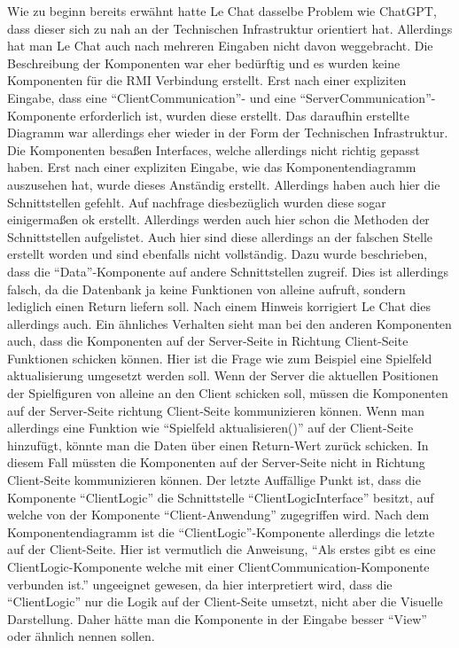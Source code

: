 Wie zu beginn bereits erwähnt hatte Le Chat dasselbe Problem wie ChatGPT, dass dieser sich zu nah an der Technischen Infrastruktur orientiert hat.
Allerdings hat man Le Chat auch nach mehreren Eingaben nicht davon weggebracht. Die Beschreibung der Komponenten war eher bedürftig und es wurden 
keine Komponenten für die RMI Verbindung erstellt. Erst nach einer expliziten Eingabe, dass eine ``ClientCommunication''- und eine 
``ServerCommunication''-Komponente erforderlich ist, wurden diese erstellt. Das daraufhin erstellte Diagramm war allerdings eher wieder in der Form 
der Technischen Infrastruktur. Die Komponenten besaßen Interfaces, welche allerdings nicht richtig gepasst haben. Erst nach einer expliziten Eingabe, wie
das Komponentendiagramm auszusehen hat, wurde dieses Anständig erstellt. Allerdings haben auch hier die Schnittstellen gefehlt. Auf nachfrage diesbezüglich
wurden diese sogar einigermaßen ok erstellt. Allerdings werden auch hier schon die Methoden der Schnittstellen aufgelistet. Auch hier sind diese allerdings 
an der falschen Stelle erstellt worden und sind ebenfalls nicht vollständig. Dazu wurde beschrieben, dass die ``Data''-Komponente auf andere Schnittstellen
zugreif. Dies ist allerdings falsch, da die Datenbank ja keine Funktionen von alleine aufruft, sondern lediglich einen Return liefern soll. Nach einem Hinweis 
korrigiert Le Chat dies allerdings auch. Ein ähnliches Verhalten sieht man bei den anderen Komponenten auch, dass die Komponenten auf der Server-Seite in Richtung
Client-Seite Funktionen schicken können. Hier ist die Frage wie zum Beispiel eine Spielfeld aktualisierung umgesetzt werden soll. Wenn der Server die aktuellen 
Positionen der Spielfiguren von alleine an den Client schicken soll, müssen die Komponenten auf der Server-Seite richtung Client-Seite kommunizieren können.
Wenn man allerdings eine Funktion wie ``Spielfeld aktualisieren()'' auf der Client-Seite hinzufügt, könnte man die Daten über einen Return-Wert zurück schicken.
In diesem Fall müssten die Komponenten auf der Server-Seite nicht in Richtung Client-Seite kommunizieren können. Der letzte Auffällige Punkt ist, dass die 
Komponente ``ClientLogic'' die Schnittstelle ``ClientLogicInterface'' besitzt, auf welche von der Komponente ``Client-Anwendung'' zugegriffen wird. Nach dem 
Komponentendiagramm ist die ``ClientLogic''-Komponente allerdings die letzte auf der Client-Seite. Hier ist vermutlich die Anweisung, ``Als erstes gibt es 
eine ClientLogic-Komponente welche mit einer ClientCommunication-Komponente verbunden ist.'' ungeeignet gewesen, da hier interpretiert wird, dass die ``ClientLogic''
nur die Logik auf der Client-Seite umsetzt, nicht aber die Visuelle Darstellung. Daher hätte man die Komponente in der Eingabe besser ``View'' oder ähnlich nennen
sollen.\\


